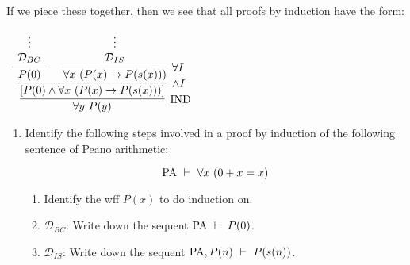 \documentclass[11pt]{report}
\begin{document}
	If we piece these together, then we see that all proofs by induction have the form: 

	\begin{mdframed}
		\begin{center}
			$\begin{array}{c}
				\infer[\IND]{\forall y \ P(y)}
					{\infer[\land I]{[P(0) \land \forall x \ (P(x) \to P(s(x)))]}
						{\infer[]{P(0)}{\begin{array}{c} \vdots \\ \mathcal{D}_{BC}\end{array}}
						&
						\infer[\forall I]{\forall x \ (P(x) \to P(s(x)))}
							{\begin{array}{c} \vdots \\ \mathcal{D}_{IS}\end{array}}}}
			\end{array}$
		\end{center}
	\end{mdframed}

	\begin{enumerate}
		\item Identify the following steps involved in a proof by induction of the following sentence of Peano arithmetic: 
		
		$$\PA \ \vdash \ \forall x \ (0+x=x) $$

			\begin{enumerate}
				\item Identify the wff $P(x)$ to do induction on. 
				\item $\mathcal{D}_{BC}$: Write down the sequent $\PA \ \vdash \ P(0)$.
				\item $\mathcal{D}_{IS}$: Write down the sequent $\PA, P(n) \ \vdash \ P(s(n))$.	
			\end{enumerate}
	\end{enumerate}
\end{document}
